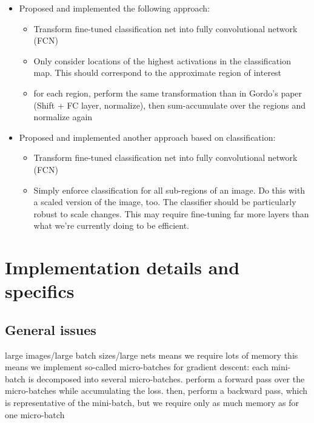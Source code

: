 \documentclass[fleqn]{article}
\begin{document}
\begin{itemize}
    \item Proposed and implemented the following approach:
    \begin{itemize}
        \item Transform fine-tuned classification net into fully
        convolutional network (FCN)
        \item Only consider locations of the highest activations
        in the classification map. This should correspond to the
        approximate region of interest
        \item for each region, perform the same transformation than
        in Gordo's paper (Shift + FC layer, normalize),
        then sum-accumulate over the regions and normalize again
    \end{itemize}
    \item Proposed and implemented another approach based on classification:
    \begin{itemize}
        \item Transform fine-tuned classification net into fully
        convolutional network (FCN)
        \item Simply enforce classification for all sub-regions of an image.
        Do this with a scaled version of the image, too. The classifier
        should be particularly robust to scale changes. This may require
        fine-tuning far more layers than what we're currently doing to be
        efficient.
    \end{itemize}
\end{itemize}





\newpage
\appendix
\section{Implementation details and specifics}
\subsection{General issues}
large images/large batch sizes/large nets means we require lots of memory
this means we implement so-called micro-batches for gradient descent:
each mini-batch is decomposed into several micro-batches.
perform a forward pass over the micro-batches while accumulating the loss.
then, perform a backward pass, which is representative of the mini-batch,
but we require only as much memory as for one micro-batch
\end{document}
